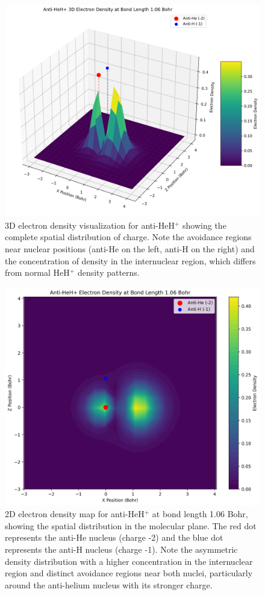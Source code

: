 \documentclass[10pt,twocolumn,a4paper]{article}
\begin{document}
\begin{figure}[t!]
    \centering
    \includegraphics[width=\columnwidth]{graphs/anti_heh_density_3d.png}
    \caption{3D electron density visualization for anti-HeH$^+$ showing the complete spatial distribution of charge. Note the avoidance regions near nuclear positions (anti-He on the left, anti-H on the right) and the concentration of density in the internuclear region, which differs from normal HeH$^+$ density patterns.}
    \label{fig:density_3d}
\end{figure}

\begin{figure}[t!]
    \centering
    \includegraphics[width=\columnwidth]{graphs/anti_heh_density_2d.png}
    \caption{2D electron density map for anti-HeH$^+$ at bond length 1.06 Bohr, showing the spatial distribution in the molecular plane. The red dot represents the anti-He nucleus (charge -2) and the blue dot represents the anti-H nucleus (charge -1). Note the asymmetric density distribution with a higher concentration in the internuclear region and distinct avoidance regions near both nuclei, particularly around the anti-helium nucleus with its stronger charge.}
    \label{fig:density_2d}
\end{figure}
\end{document}
